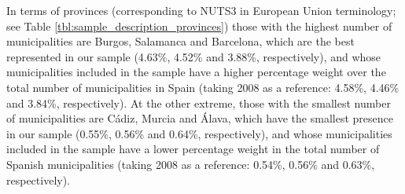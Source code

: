 \documentclass[a4paper,11pt,oneside]{article}
\begin{document}







In terms of provinces (corresponding to NUTS3 in European Union terminology; see Table \ref{tbl:sample_description_provinces}) those with the highest number of municipalities are Burgos, Salamanca and Barcelona, which are the best represented in our sample (4.63\%, 4.52\% and 3.88\%, respectively), and whose municipalities included in the sample have a higher percentage weight over the total number of municipalities in Spain (taking 2008 as a reference: 4.58\%, 4.46\% and 3.84\%, respectively). At the other extreme, those with the smallest number of municipalities are Cádiz, Murcia and Álava, which have the smallest presence in our sample (0.55\%, 0.56\% and 0.64\%, respectively), and whose municipalities included in the sample have a lower percentage weight in the total number of Spanish municipalities (taking 2008 as a reference: 0.54\%, 0.56\% and 0.63\%, respectively).
\end{document}
